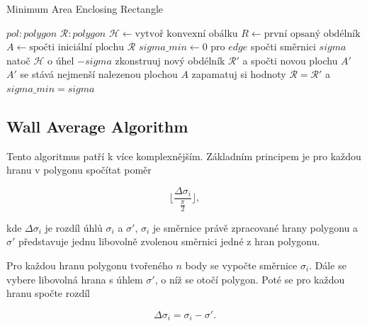 \begin{algorithm}[h]
\caption{Minimum Area Enclosing Rectangle}\label{alg:cap}
\begin{algorithmic}
\Require $pol: polygon$
\Ensure $\mathcal{R}: polygon$
\State
\State $\mathcal{H} \gets {\text{vytvoř konvexní obálku}}$
\State $R \gets {\text{první opsaný obdélník}}$ 
\State $A \gets {\text{spočti iniciální plochu }}\mathcal{R}$
\State $sigma\_min \gets 0$ 
\State
{}
    \State pro $edge$ spočti směrnici $sigma$
    \State natoč $\mathcal{H}$ o úhel $-sigma$
    \State zkonstruuj nový obdélník $\mathcal{R}'$ a spočti novou plochu $A'$
    \State
     
    \State  $A'$ se stává nejmenší nalezenou plochou $A$
    \State zapamatuj si hodnoty $\mathcal{R} = \mathcal{R}'$ a $sigma\_min = sigma$
    \EndIf
\EndFor
\State
{}

\end{algorithmic}
\end{algorithm}

\bigbreak
\bigbreak
\subsection*{Wall Average Algorithm}

\par Tento algoritmus patří k více komplexnějším. Základním principem je pro každou hranu v polygonu spočítat poměr

\begin{equation}\biggl\lfloor \frac{\Delta\sigma_i}{\frac{\pi}{2}} \biggr\rfloor,\end{equation}

\par kde $\Delta \sigma_i$ je rozdíl úhlů $\sigma_i$ a $\sigma{'}$, $\sigma_i$ je směrnice právě zpracované hrany polygonu a $\sigma{'}$ představuje jednu libovolně zvolenou směrnici jedné z hran polygonu.

\par Pro každou hranu polygonu tvořeného $n$ body se vypočte směrnice $\sigma_i$. Dále se vybere libovolná hrana s úhlem $\sigma'$, o níž se otočí polygon. Poté se pro každou hranu spočte rozdíl 

\begin{equation} \Delta\sigma_i = \sigma_i - \sigma'. \end{equation}

